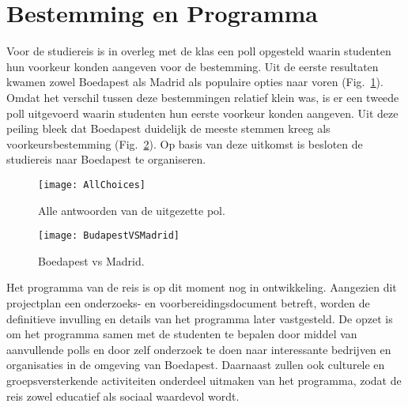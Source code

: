 \section{Bestemming en Programma}

Voor de studiereis is in overleg met de klas een poll opgesteld waarin studenten hun voorkeur konden aangeven voor de bestemming. Uit de eerste resultaten kwamen zowel Boedapest als Madrid als populaire opties naar voren (Fig.~\ref{fig:AllChoices}). Omdat het verschil tussen deze bestemmingen relatief klein was, is er een tweede poll uitgevoerd waarin studenten hun eerste voorkeur konden aangeven. Uit deze peiling bleek dat Boedapest duidelijk de meeste stemmen kreeg als voorkeursbestemming (Fig.~\ref{fig:MadridVsBoedapest}). Op basis van deze uitkomst is besloten de studiereis naar Boedapest te organiseren.

\begin{figure}[h!]
	\centering
	\texttt{[image: AllChoices]}
	\label{fig:AllChoices}
	\caption{Alle antwoorden van de uitgezette pol.}
\end{figure}

\begin{figure}[h!]
	\centering
	\texttt{[image: BudapestVSMadrid]}
	\label{fig:MadridVsBoedapest}
	\caption{Boedapest vs Madrid.}
\end{figure}

Het programma van de reis is op dit moment nog in ontwikkeling. Aangezien dit projectplan een onderzoeks- en voorbereidingsdocument betreft, worden de definitieve invulling en details van het programma later vastgesteld. De opzet is om het programma samen met de studenten te bepalen door middel van aanvullende polls en door zelf onderzoek te doen naar interessante bedrijven en organisaties in de omgeving van Boedapest. Daarnaast zullen ook culturele en groepsversterkende activiteiten onderdeel uitmaken van het programma, zodat de reis zowel educatief als sociaal waardevol wordt.